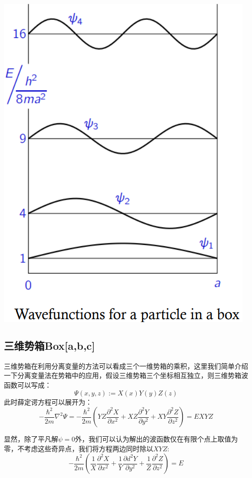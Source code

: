 \begin{center}
    \includegraphics[scale=0.4]{fig/lzhx/微信图片_20211025150139.png}
\end{center}

\subsection{三维势箱Box[a,b,c]}
三维势箱在利用分离变量的方法可以看成三个一维势箱的乘积，这里我们简单介绍一下分离变量法在势箱中的应用，假设三维势箱三个坐标相互独立，则三维势箱波函数可以写成：
\[\varPsi(x,y,z):=X(x)Y(y)Z(z)\]
此时薛定谔方程可以展开为：
\[-\frac{\hbar^2}{2m}\nabla^2\varPsi=-\frac{\hbar^2}{2m}\left (YZ\frac{\partial^2X}{\partial x^2}+XZ\frac{\partial^2Y}{\partial y^2}+XY\frac{\partial^2Z}{\partial z^2} \right )=EXYZ\]

显然，除了平凡解$\psi=0$外，我们可以认为解出的波函数仅在有限个点上取值为零，不考虑这些奇异点，我们将方程两边同时除以$XYZ$:
\[-\frac{\hbar^2}{2m}\left (\frac{1}{X}\frac{\partial^2X}{\partial x^2}+\frac{1}{Y}\frac{\partial{d}^2Y}{\partial y^2}+\frac{1}{Z}\frac{\partial^2Z}{\partial z^2} \right )=E\]

